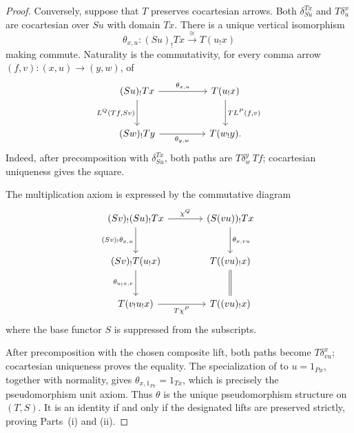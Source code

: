 \documentclass[11pt]{article}
\theoremstyle{plain}
\theoremstyle{definition}
\theoremstyle{remark}
\numberwithin{equation}{section}
\begin{document}
\begin{proof}
Conversely, suppose that $T$ preserves cocartesian arrows.  Both
$\delta^{Tx}_{Su}$ and $T\delta^x_u$ are cocartesian over $Su$ with
domain $Tx$.  There is a unique vertical isomorphism
\begin{equation*}
  \theta_{x,u}\colon(Su)_!Tx\xrightarrow{\ \cong\ }T(u_!x)
\end{equation*}
making  commute.  Naturality
is the commutativity, for every comma arrow
$(f,v)\colon(x,u)\to(y,w)$, of
\begin{equation}
\begin{tikzcd}[column sep=huge,row sep=large]
(Su)_!Tx \arrow[r,"{\theta_{x,u}}"]
  \arrow[d,"{L^Q(Tf,Sv)}"']
  & T(u_!x) \arrow[d,"{T L^P(f,v)}"] \\
(Sw)_!Ty \arrow[r,"{\theta_{y,w}}"']
  & T(w_!y).
\end{tikzcd}
\label{eq:pseudomorphism-naturality-square}
\end{equation}
Indeed, after precomposition with $\delta^{Tx}_{Su}$, both paths are
$T\delta^y_w\,Tf$; cocartesian uniqueness gives the square.

\begin{samepage}
\noindent
The multiplication axiom is expressed by the commutative diagram
\begin{equation}
\begin{tikzcd}[column sep=large,row sep=large]
(Sv)_!(Su)_!Tx
  \arrow[r,"\chi^Q"]
  \arrow[d,"{(Sv)_!\theta_{x,u}}"']
& (S(vu))_!Tx
  \arrow[d,"{\theta_{x,vu}}"] \\
(Sv)_!T(u_!x)
  \arrow[d,"{\theta_{u_!x,v}}"']
& T((vu)_!x) \\
T(v_!u_!x)
  \arrow[r,"T\chi^P"']
& T((vu)_!x) \arrow[u,equal]
\end{tikzcd}
\label{eq:pseudomorphism-composition}
\end{equation}
where the base functor $S$ is suppressed from the subscripts.
\end{samepage}
After precomposition with the chosen composite lift, both paths become
$T\delta^x_{vu}$; cocartesian uniqueness proves the equality.  The
specialization of  to
$u=1_{Px}$, together with normality, gives
$\theta_{x,1_{Px}}=1_{Tx}$, which is precisely the pseudomorphism unit
axiom.  Thus $\theta$ is the unique pseudomorphism structure on
$(T,S)$.  It is an identity if and only if the designated lifts are
preserved strictly, proving
Parts~\textup{(i)} and \textup{(ii)}.


\end{proof}
\end{document}

